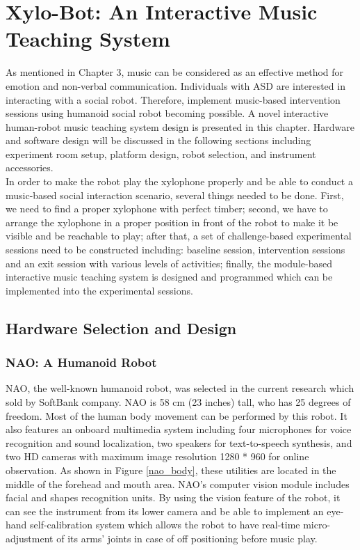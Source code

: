 \chapter{Xylo-Bot: An Interactive Music Teaching System} 
As mentioned in Chapter 3, music can be considered as an effective method
for emotion and non-verbal communication. Individuals with ASD are interested in 
interacting with a social robot. Therefore, implement music-based intervention
sessions using humanoid social robot becoming possible. A novel interactive human-robot 
music teaching system design is presented in this chapter. Hardware and software
design will be discussed in the following sections including experiment room setup, platform design, robot selection, and instrument accessories.\\

In order to make the robot play the xylophone properly and be able to conduct a
music-based social interaction scenario, several things needed to be done. 
First, we need to find a proper xylophone with perfect timber; second, we 
have to arrange the xylophone in a proper position in front of the robot 
to make it be visible and be reachable to play; after that, a set of challenge-based 
experimental sessions need to be constructed including: baseline session, intervention
sessions and an exit session with various levels of activities; finally, the
module-based interactive music teaching system is designed and programmed 
which can be implemented into the experimental sessions.\\

\section{Hardware Selection and Design}

\subsection{NAO: A Humanoid Robot}
NAO, the well-known humanoid robot, was selected in the current research which sold by SoftBank company. 
NAO is 58 cm (23 inches) tall, who has 25 degrees of freedom. Most of the human body
movement can be performed by this robot. It also features an onboard multimedia 
system including four microphones for voice recognition and sound localization, 
two speakers for text-to-speech synthesis, and two HD cameras with maximum image 
resolution 1280 * 960 for online observation. As shown in Figure \ref{nao_body}, these 
utilities are located in the middle of the forehead and mouth area. NAO’s 
computer vision module includes facial and shapes recognition units. By using the 
vision feature of the robot, it can see the instrument from its lower camera 
and be able to implement an eye-hand self-calibration system which allows the 
robot to have real-time micro-adjustment of its arms' joints in case of off 
positioning before music play.\\

